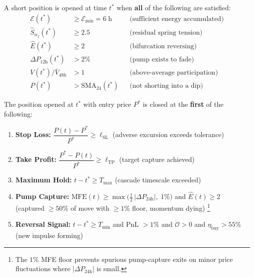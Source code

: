 \documentclass[11pt,a4paper]{article}
\newcommand{\af}{\alpha_f}
\newcommand{\OI}{\mathcal{O}}
\begin{document}
\begin{tcolorbox}[boxstyle, title=Entry Condition (SHORT)]
A short position is opened at time $t^*$ when \textbf{all} of the following 
are satisfied:
\begin{align}
\label{eq:entry}
\mathcal{E}(t^*) &\ge \mathcal{E}_{\min} = 6\;\text{h} 
    & &\text{(sufficient energy accumulated)} \\
\hat{S}_{\af}(t^*) &\ge 2.5 
    & &\text{(residual spring tension)} \\
\hat{E}(t^*) &\ge 2 
    & &\text{(bifurcation reversing)} \\
\Delta P_{12\text{h}}(t^*) &> 2\% 
    & &\text{(pump exists to fade)} \\
V(t^*)/\bar{V}_{48\text{h}} &> 1 
    & &\text{(above-average participation)} \\
P(t^*) &> \mathrm{SMA}_{24}(t^*) 
    & &\text{(not shorting into a dip)}
\end{align}
\end{tcolorbox}

\begin{tcolorbox}[boxstyle, title=Exit Conditions]
The position opened at $t^*$ with entry price $P^*$ is closed at the 
\textbf{first} of the following:
\begin{enumerate}[nosep,label=(\roman*)]
    \item \textbf{Stop Loss:} 
    $\dfrac{P(t) - P^*}{P^*} \ge \ell_{\mathrm{SL}}$ 
    \quad (adverse excursion exceeds tolerance)
    
    \item \textbf{Take Profit:} 
    $\dfrac{P^* - P(t)}{P^*} \ge \ell_{\mathrm{TP}}$ 
    \quad (target capture achieved)
    
    \item \textbf{Maximum Hold:} 
    $t - t^* \ge T_{\max}$ 
    \quad (cascade timescale exceeded)
    
    \item \textbf{Pump Capture:} 
    $\mathrm{MFE}(t) \ge \max\bigl(\tfrac{1}{2}\,|\Delta P_{24\text{h}}|,\; 1\%\bigr)$ 
    and $\hat{E}(t) \ge 2$ 
    \quad (captured $\ge 50\%$ of move with $\ge 1\%$ floor, momentum dying)%
    \footnote{The $1\%$ MFE floor prevents spurious pump-capture exits on 
    minor price fluctuations where $|\Delta P_{24\text{h}}|$ is small.}
    
    \item \textbf{Reversal Signal:} 
    $t - t^* \ge T_{\min}$ and PnL $> 1\%$ and $\dot{\OI} > 0$ 
    and $\eta_{\mathrm{buy}} > 55\%$ \quad (new impulse forming)
\end{enumerate}
\end{tcolorbox}
\end{document}
